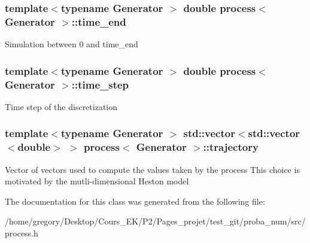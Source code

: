 \subsubsection[{\texorpdfstring{time\+\_\+end}{time_end}}]{\setlength{\rightskip}{0pt plus 5cm}template$<$typename Generator $>$ double {\bf process}$<$ Generator $>$\+::time\+\_\+end\hspace{0.3cm}{\ttfamily [protected]}}\hypertarget{classprocess_aee60ec54e570201c8c115005aa0a4f30}{}\label{classprocess_aee60ec54e570201c8c115005aa0a4f30}
Simulation between 0 and time\+\_\+end 
\subsubsection[{\texorpdfstring{time\+\_\+step}{time_step}}]{\setlength{\rightskip}{0pt plus 5cm}template$<$typename Generator $>$ double {\bf process}$<$ Generator $>$\+::time\+\_\+step\hspace{0.3cm}{\ttfamily [protected]}}\hypertarget{classprocess_a058283b545a3ac9733136b6f48177586}{}\label{classprocess_a058283b545a3ac9733136b6f48177586}
Time step of the discretization 
\subsubsection[{\texorpdfstring{trajectory}{trajectory}}]{\setlength{\rightskip}{0pt plus 5cm}template$<$typename Generator $>$ std\+::vector$<$std\+::vector$<$double$>$ $>$ {\bf process}$<$ Generator $>$\+::trajectory\hspace{0.3cm}{\ttfamily [protected]}}\hypertarget{classprocess_a63939362bca6b3ee7941c7219954719c}{}\label{classprocess_a63939362bca6b3ee7941c7219954719c}
Vector of vectors used to compute the values taken by the process This choice is motivated by the mutli-\/dimensional Heston model 

The documentation for this class was generated from the following file\+:\begin{DoxyCompactItemize}
\item 
/home/gregory/\+Desktop/\+Cours\+\_\+\+E\+K/\+P2/\+Pages\+\_\+projet/test\+\_\+git/proba\+\_\+num/src/process.\+h\end{DoxyCompactItemize}
